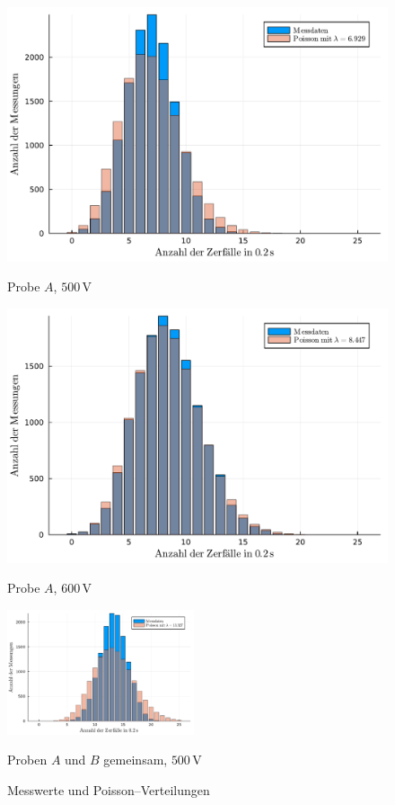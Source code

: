 \documentclass[12pt,a4paper]{scrartcl}
\numberwithin{equation}{section} %
\begin{document}
\begin{figure}[ht]
	\centering
	\begin{minipage}{0.49\textwidth}
		\centering
		\includegraphics[width=\textwidth]{../media/B3.1/poisson1.pdf}
		\caption*{Probe $A$, $500 \mathrm{\, V}$}
	\end{minipage}
	\begin{minipage}{0.49\textwidth}
		\centering
		\includegraphics[width=\textwidth]{../media/B3.1/poisson2.pdf}
		\caption*{Probe $A$, $600 \mathrm{\, V}$}
	\end{minipage}
	\vspace{3pt}
	
	\includegraphics[width=0.49\textwidth]{../media/B3.1/poisson3.pdf}
	\caption*{Proben $A$ und $B$ gemeinsam, $500 \mathrm{\, V}$}
	\vspace{3pt}
	
	\caption{Messwerte und Poisson--Verteilungen}
	\label{fig:poisson single}
\end{figure}
\end{document}
